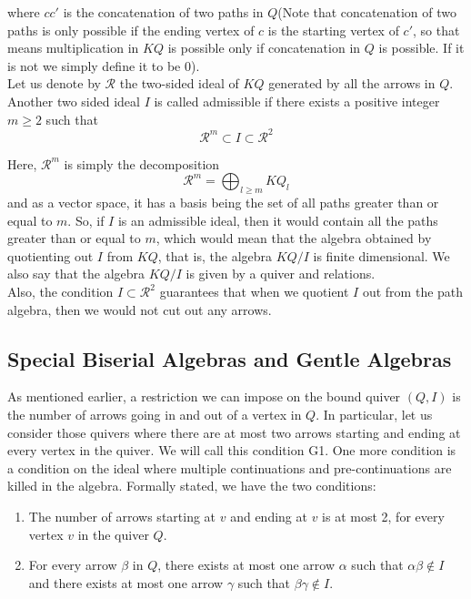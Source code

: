 \documentclass{article}
\numberwithin{figure}{section}
\begin{document}
where $c c'$ is the concatenation of two paths in $Q$(Note that concatenation of two paths is only possible if the ending vertex of $c$ is the starting vertex of $c'$, so that means multiplication in $KQ$ is possible only if concatenation in $Q$ is possible. If it is not we simply define it to be 0). \\


Let us denote by $\mathcal{R}$ the two-sided ideal of $KQ$ generated by all the arrows in $Q$. Another two sided ideal $I$ is called admissible if there exists a positive integer $m\geq 2$ such that 
\[
\mathcal{R}^m \subset I \subset \mathcal{R}^2
\]

Here, $\mathcal{R}^m$ is simply the decomposition $$\mathcal{R}^m=\bigoplus_{l \geq m}KQ_l$$ and as a vector space, it has a basis being the set of all paths greater than or equal to $m$. So, if $I$ is an admissible ideal, then it would contain all the paths greater than or equal to $m$, which would mean that the algebra obtained by quotienting out $I$ from $KQ$, that is, the algebra $KQ/I$ is finite dimensional. We also say that the algebra $KQ/I$ is given by a quiver and relations. \\
Also, the condition $I \subset\mathcal{R}^2$ guarantees that when we quotient $I$ out from the path algebra, then we would not cut out any arrows.\\

\subsection{Special Biserial Algebras and Gentle Algebras}

As mentioned earlier, a restriction we can impose on the bound quiver $(Q,I)$ is the number of arrows going in and out of a vertex in $Q$. In particular, let us consider those quivers where there are at most two arrows starting and ending at every vertex in the quiver. We will call this condition G1. One more condition is a condition on the ideal where multiple continuations and pre-continuations are killed in the algebra. Formally stated, we have the two conditions:
\begin{enumerate}
    \item[G1)] The number of arrows starting at $v$ and ending at $v$ is at most 2, for every vertex $v$ in the quiver $Q$.
    \item[G2)] For every arrow $\beta$ in $Q$, there exists at most one arrow $\alpha$ such that $\alpha\beta\notin I$ and there exists at most one arrow $\gamma$ such that $\beta\gamma \notin I$.
\end{enumerate}
\end{document}
